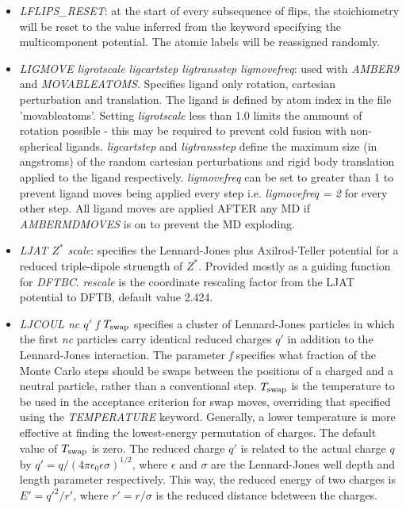 \documentclass[12pt,a4paper,dvips]{article}
\begin{document}
\begin{itemize}
\item {\it LFLIPS\_RESET\/}: at the start of every subsequence of flips, the stoichiometry will be reset to the value inferred from the keyword specifying the multicomponent potential. The atomic labels will be reassigned randomly.

\item {\it LIGMOVE ligrotscale ligcartstep ligtransstep ligmovefreq\/}: used with {\it AMBER9\/} and {\it MOVABLEATOMS}. Specifies ligand only rotation, cartesian perturbation and translation. The ligand is defined by atom index in the file 'movableatoms'. Setting {\it ligrotscale} less than 1.0
limits the ammount of rotation possible - this may be required to prevent cold fusion with non-spherical ligands. {\it ligcartstep} and {\it ligtransstep} 
define the maximum size (in angstroms) of the random cartesian perturbations and rigid body translation applied to the ligand respectively. 
{\it ligmovefreq} can be set to greater than 1 to prevent ligand moves being applied every step i.e. {\it ligmovefreq = 2} for every other step.
All ligand moves are applied AFTER any MD if {\it AMBERMDMOVES} is on to prevent the MD exploding.    

\item {\it LJAT $Z^*$ scale\/}: specifies the Lennard-Jones plus Axilrod-Teller 
potential for a reduced triple-dipole struength of $Z^*$.
Provided mostly as a guiding function for {\it DFTBC\/}. 
{\it rescale\/} is the coordinate rescaling factor from the LJAT potential
to DFTB, default value 2.424.

\item {\it LJCOUL nc $q'$ f $T_{\rm swap}$} specifies a cluster of Lennard-Jones particles in which the first {\it nc}
particles carry identical reduced charges {\it $q'$} in addition to the Lennard-Jones interaction.
The parameter {\it f} specifies what fraction of the Monte Carlo steps should be swaps between the
positions of a charged and a neutral particle, rather than a conventional step.
$T_{\rm swap}$ is the temperature to be used in the acceptance criterion for swap moves, overriding
that specified using the {\it TEMPERATURE} keyword.  Generally, a lower temperature is more effective
at finding the lowest-energy permutation of charges.  The default value of $T_{\rm swap}$ is zero.
The reduced charge $q'$ is related to the actual charge $q$ by $q'=q/(4\pi\epsilon_0\epsilon\sigma)^{1/2}$,
where $\epsilon$ and $\sigma$ are the Lennard-Jones well depth and length parameter respectively.
This way, the reduced energy of two charges is $E'=q'^2/r'$, where $r'=r/\sigma$ is the reduced distance
bdetween the charges.


\end{itemize}
\end{document}
